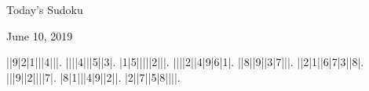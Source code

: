 \documentclass{article}
\begin{document}
\begin{center}
\Huge{Today's Sudoku}
\end{center}
\begin{center}
\Large{June 10, 2019}
\end{center}
\begin{sudoku}
||9|2|1|||4|||.
||||4|||5||3|.
|1|5|||||2|||.
||||2||4|9|6|1|.
||8||9||3|7|||.
||2|1||6|7|3||8|.
|||9||2||||7|.
|8|1|||4|9||2||.
|2||7||5|8||||.
\end{sudoku}
\end{document}
